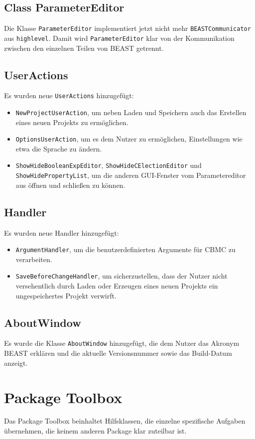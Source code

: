 \documentclass[a4paper]{scrreprt}
\begin{document}
\subsection{Class ParameterEditor}
Die Klasse \verb!ParameterEditor! implementiert jetzt nicht mehr \verb!BEASTCommunicator! aus \verb!highlevel!. Damit wird \verb!ParameterEditor! klar von der Kommunikation zwischen den einzelnen Teilen von BEAST getrennt. \\

\subsection{UserActions}
Es wurden neue \verb!UserActions! hinzugefügt:
\begin{itemize}
\item \verb!NewProjectUserAction!, um neben Laden und Speichern auch das Erstellen eines neuen Projekts zu ermöglichen.
\item \verb!OptionsUserAction!, um es dem Nutzer zu ermöglichen, Einstellungen wie etwa die Sprache zu ändern.
\item \verb!ShowHideBooleanExpEditor!, \verb!ShowHideCElectionEditor! und \verb!ShowHidePropertyList!, um die anderen GUI-Fenster vom Parametereditor aus öffnen und schließen zu können.
\end{itemize}

\subsection{Handler}
Es wurden neue Handler hinzugefügt:
\begin{itemize}
\item \verb!ArgumentHandler!, um die benutzerdefinierten Argumente für CBMC zu verarbeiten.
\item \verb!SaveBeforeChangeHandler!, um sicherzustellen, dass der Nutzer nicht versehentlich durch Laden oder Erzeugen eines neuen Projekts ein ungespeichertes Projekt verwirft.
\end{itemize}

\subsection{AboutWindow}
Es wurde die Klasse \verb!AboutWindow! hinzugefügt, die dem Nutzer das Akronym BEAST erklären und die aktuelle Versionsnummer sowie das Build-Datum anzeigt.

\section{Package Toolbox}
Das Package Toolbox beinhaltet Hilfsklassen, die einzelne spezifische Aufgaben übernehmen, die keinem anderen Package klar zuteilbar ist.
\end{document}
